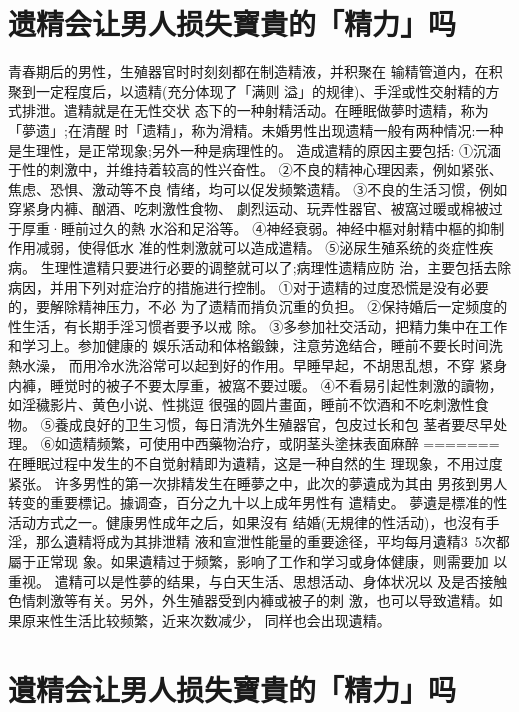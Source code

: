 \documentclass[12pt,UTF8]{ctexbook}
\begin{document}
\section{遗精会让男人损失寶貴的「精力」吗}

青春期后的男性，生殖器官时时刻刻都在制造精液，并积聚在
输精管道内，在积聚到一定程度后，以遗精(充分体现了「满则
溢」的规律)、手淫或性交射精的方式排泄。遣精就是在无性交状
态下的一种射精活动。在睡眠做夢时遗精，称为「夢遗」;在清醒
时「遗精」，称为滑精。未婚男性出现遗精一般有两种情况:一种
是生理性，是正常现象;另外一种是病理性的。
造成遣精的原因主要包括:
①沉湎于性的刺激中，并维持着较高的性兴奋性。
②不良的精神心理因素，例如紧张、焦虑、恐惧、激动等不良
情绪，均可以促发频繁遗精。
③不良的生活习惯，例如穿紧身内褲、酗酒、吃刺激性食物、
劇烈运动、玩弄性器官、被窩过暖或棉被过于厚重·睡前过久的熱
水浴和足浴等。
④神经衰弱。神经中樞对射精中樞的抑制作用减弱，使得低水
准的性刺激就可以造成遣精。
⑤泌尿生殖系统的炎症性疾病。
生理性遣精只要进行必要的调整就可以了;病理性遗精应防
治，主要包括去除病因，并用下列对症治疗的措施进行控制。
①对于遗精的过度恐慌是没有必要的，要解除精神压力，不必
为了遗精而掯负沉重的负担。
②保持婚后一定频度的性生活，有长期手淫习惯者要予以戒
除。
③多参加社交活动，把精力集中在工作和学习上。参加健康的
娛乐活动和体格鍛鍊，注意劳逸结合，睡前不要长时间洗熱水澡，
而用冷水洗浴常可以起到好的作用。早睡早起，不胡思乱想，不穿
紧身内褲，睡觉时的被子不要太厚重，被窩不要过暖。
④不看易引起性刺激的讀物，如淫穢影片、黄色小说、性挑逗
很强的圆片畫面，睡前不饮酒和不吃刺激性食物。
⑤養成良好的卫生习惯，每日清洗外生殖器官，包皮过长和包
茎者要尽早处理。
⑥如遗精频繁，可使用中西藥物治疗，或阴茎头塗抹表面麻醉
=======
在睡眠过程中发生的不自觉射精即为遺精，这是一种自然的生
理现象，不用过度紧张。
许多男性的第一次排精发生在睡夢之中，此次的夢遺成为其由
男孩到男人转变的重要標记。據调查，百分之九十以上成年男性有
遣精史。
夢遺是標准的性活动方式之一。健康男性成年之后，如果沒有
结婚(无規律的性活动)，也沒有手淫，那么遺精将成为其排泄精
液和宣泄性能量的重要途径，平均每月遺精3~5次都屬于正常现
象。如果遺精过于频繁，影响了工作和学习或身体健康，则需要加
以重视。
遣精可以是性夢的结果，与白天生活、思想活动、身体状况以
及是否接触色情刺激等有关。另外，外生殖器受到内褲或被子的刺
激，也可以导致遣精。如果原来性生活比较频繁，近来次数减少，
同样也会出现遺精。

\section{遺精会让男人损失寶貴的「精力」吗}
\end{document}
